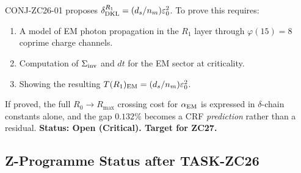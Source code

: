 \documentclass[12pt, a4paper]{article}
\begin{document}
\begin{openqbox}[title={GAP-ZC26-01: Derive $0.600\,\varepsilon_0^2$
  from $R_1$ EM Dynamics (Critical)}]
CONJ-ZC26-01 proposes $\delta_{\rm DKL}^{R_1} = (d_s/n_m)\varepsilon_0^2$.
To prove this requires:
\begin{enumerate}[leftmargin=*, noitemsep]
  \item A model of EM photon propagation in the $R_1$ layer
    through $\varphi(15) = 8$ coprime charge channels.
  \item Computation of $\Sigma_{\rm inv}$ and $dt$ for the
    EM sector at criticality.
  \item Showing the resulting $T(R_1)_{\rm EM} = (d_s/n_m)\varepsilon_0^2$.
\end{enumerate}
If proved, the full $R_0\to R_{\max}$ crossing cost for
$\alpha_{\rm EM}$ is expressed in $\delta$-chain constants alone,
and the gap $0.132\%$ becomes a CRF \emph{prediction} rather than
a residual.
\textbf{Status: Open (Critical). Target for ZC27.}
\end{openqbox}

\subsection{Z-Programme Status after TASK-ZC26}
\label{zc26:sec:status}
\end{document}

